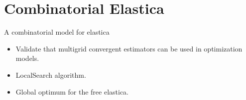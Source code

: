 \section{Combinatorial Elastica}

\begin{frame}
\center
\huge
A combinatorial model for elastica

\vspace{2em}

\begin{minipage}{0.7\textwidth}
\normalsize
\begin{itemize}
\item{Validate that multigrid convergent estimators can be used in optimization models.}
\item{LocalSearch algorithm.}
\item{Global optimum for the free elastica.}
\end{itemize}
\end{minipage}


\end{frame}

